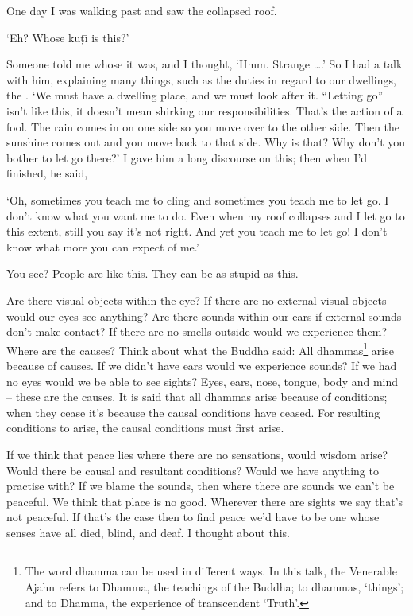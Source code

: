 One day I was walking past and saw the collapsed roof.

`Eh? Whose ku\d{t}\={\i}  is this?'

Someone told me whose it was, and I thought, `Hmm. Strange \ldots{}.' So I had a talk with him, explaining many things, such as the duties in regard to our dwellings, the . `We must have a dwelling place, and we must look after it. ``Letting go'' isn't like this, it doesn't mean shirking our responsibilities. That's the action of a fool. The rain comes in on one side so you move over to the other side. Then the sunshine comes out and you move back to that side. Why is that? Why don't you bother to let go there?' I gave him a long discourse on this; then when I'd finished, he said,

`Oh,  sometimes you teach me to cling and sometimes you teach me to let go. I don't know what you want me to do. Even when my roof collapses and I let go to this extent, still you say it's not right. And yet you teach me to let go! I don't know what more you can expect of me.'

You see? People are like this. They can be as stupid as this.

Are there visual objects within the eye? If there are no external visual objects would our eyes see anything? Are there sounds within our ears if external sounds don't make contact? If there are no smells outside would we experience them? Where are the causes? Think about what the Buddha said: All dhammas\footnote{The word dhamma can be used in different ways. In this talk, the Venerable Ajahn refers to Dhamma, the teachings of the Buddha; to dhammas, `things'; and to Dhamma, the experience of transcendent `Truth'.} arise because of causes. If we didn't have ears would we experience sounds? If we had no eyes would we be able to see sights? Eyes, ears, nose, tongue, body and mind -- these are the causes. It is said that all dhammas arise because of conditions; when they cease it's because the causal conditions have ceased. For resulting conditions to arise, the causal conditions must first arise.

If we think that peace lies where there are no sensations, would wisdom arise? Would there be causal and resultant conditions? Would we have anything to practise with? If we blame the sounds, then where there are sounds we can't be peaceful. We think that place is no good. Wherever there are sights we say that's not peaceful. If that's the case then to find peace we'd have to be one whose senses have all died, blind, and deaf. I thought about this.

